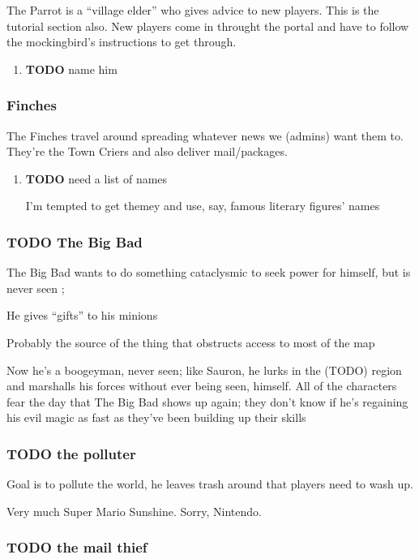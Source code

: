 \documentclass[11pt]{article}
\begin{document}
The Parrot is a “village elder” who gives advice to new players.
This is the tutorial section also.  New players come in throught the
portal and have to follow the mockingbird's instructions to
get through.

\begin{enumerate}
\item {\bfseries\sffamily TODO} name him
\label{sec-2-3-1-1}
\end{enumerate}
\subsubsection{Finches}
\label{sec-2-3-2}

The Finches travel around spreading whatever news we (admins) want
them to.  They're the Town Criers and also deliver
mail/packages.

\begin{enumerate}
\item {\bfseries\sffamily TODO} need a list of names
\label{sec-2-3-2-1}

I'm tempted to get themey and use, say, famous literary figures' names
\end{enumerate}
\subsubsection{{\bfseries\sffamily TODO} The Big Bad}
\label{sec-2-3-3}

The Big Bad wants  to do something cataclysmic to seek power for
himself, but is never seen ; 

He gives “gifts” to his minions

Probably the source of the thing that obstructs access to most of the map

Now he's a boogeyman, never seen; like Sauron, he lurks in the (TODO)
region and marshalls his forces without ever being seen, himself. All
of the characters fear the day that The Big Bad shows up again; they
don't know if he's regaining his evil magic as fast as they've been
building up their skills
\subsubsection{{\bfseries\sffamily TODO} the polluter}
\label{sec-2-3-4}

Goal  is to  pollute the world,  he leaves trash  around that
players need to wash up.

Very much Super Mario Sunshine. Sorry, Nintendo. 
\subsubsection{{\bfseries\sffamily TODO} the mail thief}
\label{sec-2-3-5}
\end{document}
